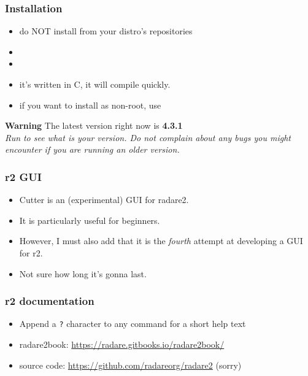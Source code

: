 \documentclass[aspectratio=169]{beamer}
\begin{document}
\begin{frame}[fragile]
	\frametitle{Installation}
	\begin{itemize}
		\item do NOT install from your distro's repositories
		\item {}
		\item {}
		\item it's written in C, it will compile quickly.
	\end{itemize}
	\vspace{2em}
	\begin{itemize}
		\item if you want to install as non-root, use 
	\end{itemize}
	\pause
	{
	\begin{alertblock}{\textbf{Warning}}
		The latest version right now is \textbf{4.3.1} \\
		\emph{Run}  \emph{to see what is your version. Do not complain about any bugs you might encounter if you are running an older version.}
	\end{alertblock}
	}
\end{frame}

\begin{frame}[fragile]
	\frametitle{r2 GUI}
	\begin{itemize}
	\item Cutter is an (experimental) GUI for radare2. 
	\item It is particularly useful for beginners.
	\end{itemize}
	\vspace{2em} 
	\pause

	\begin{itemize}
		\item However, I must also add that it is the \emph{fourth} attempt at developing a GUI for r2.
		\item Not sure how long it's gonna last.
	\end{itemize}

\end{frame}

\begin{frame}[fragile]
	\frametitle{r2 documentation}
	\begin{itemize}
		\item Append a \texttt{?} character to any command for a short help text
		\item radare2book: \href{https://radare.gitbooks.io/radare2book/}{https://radare.gitbooks.io/radare2book/} 
		\item source code: \href{https://github.com/radareorg/radare2}{https://github.com/radareorg/radare2} (sorry)
	\end{itemize}
\end{frame}
\end{document}
